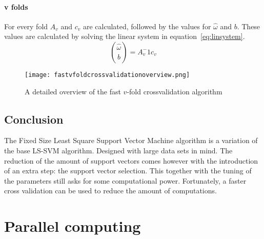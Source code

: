 \paragraph{v folds}
For every fold $A_v$ and $c_v$ are calculated, followed by the values for $\hat{\omega}$ and $b$.
These values are calculated by solving the linear system in equation~\ref{eq:linsystem}.
\begin{equation}
	\binom{\hat{\omega}}{b} = A_v^-1c_v
	\label{eq:linsystem}
\end{equation}
\begin{figure}
	\centering
	\texttt{[image: fastvfoldcrossvalidationoverview.png]}
	\caption{A detailed overview of the fast $v$-fold crossvalidation algorithm}
	\label{fig:fastvfoldcrossvalidationoverview}
\end{figure}
\subsection{Conclusion}
The Fixed Size Least Square Support Vector Machine algorithm is a variation of the base LS-SVM algorithm.
Designed with large data sets in mind.
The reduction of the amount of support vectors comes however with the introduction of an extra step: the support vector selection.
This together with the tuning of the parameters still asks for some computational power.
Fortunately, a faster cross validation can be used to reduce the amount of computations.\cite{Optimized2010:article}

\section{Parallel computing}
